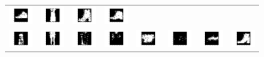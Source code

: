 \documentclass[12pt]{report}
\begin{document}
\begin{figure}[H]
\begin{tabular}{cccccccc}
  \includegraphics[width=0.1\linewidth]{qn2_i_36.png} &   \includegraphics[width=0.1\linewidth]{qn2_i_37.png} &
  \includegraphics[width=0.1\linewidth]{qn2_i_38.png} &   \includegraphics[width=0.1\linewidth]{qn2_i_39.png} \\
  \includegraphics[width=0.1\linewidth]{qn2_i_40.png} &   \includegraphics[width=0.1\linewidth]{qn2_i_41.png} &
  \includegraphics[width=0.1\linewidth]{qn2_i_42.png} &   \includegraphics[width=0.1\linewidth]{qn2_i_43.png} &
  \includegraphics[width=0.1\linewidth]{qn2_i_44.png} &   \includegraphics[width=0.1\linewidth]{qn2_i_45.png} &
  \includegraphics[width=0.1\linewidth]{qn2_i_46.png} &   \includegraphics[width=0.1\linewidth]{qn2_i_47.png} \\

\end{tabular}
\end{figure}
\end{document}
